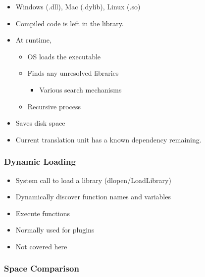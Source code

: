 \begin{itemize}
\itemsep1pt\parskip0pt
\item
  Windows (.dll), Mac (.dylib), Linux (.so)
\item
  Compiled code is left in the library.
\item
  At runtime,

  \begin{itemize}
  \itemsep1pt\parskip0pt
  \item
    OS loads the executable
  \item
    Finds any unresolved libraries

    \begin{itemize}
    \itemsep1pt\parskip0pt
    \item
      Various search mechanisms
    \end{itemize}
  \item
    Recursive process
  \end{itemize}
\item
  Saves disk space
\item
  Current translation unit has a known dependency remaining.
\end{itemize}

\subsubsection{Dynamic Loading}\label{dynamic-loading}

\begin{itemize}
\itemsep1pt\parskip0pt
\item
  System call to load a library (dlopen/LoadLibrary)
\item
  Dynamically discover function names and variables
\item
  Execute functions
\item
  Normally used for plugins
\item
  Not covered here
\end{itemize}

\subsubsection{Space Comparison}\label{space-comparison}

